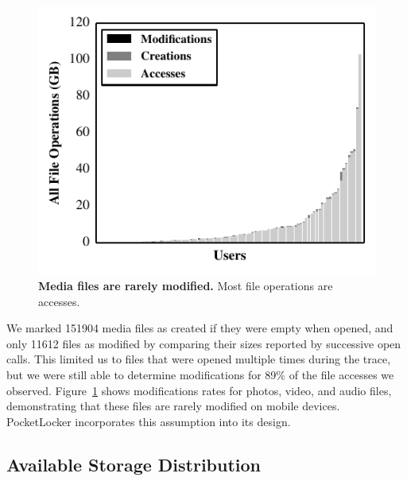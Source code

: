 \begin{figure}[t]

\includegraphics[width=\columnwidth]{./figures/pocketlocker/OperationPercentageGraph.pdf}

\caption{\small \textbf{Media files are rarely modified.} Most file
operations are accesses.}

\label{fig-motivation-modification}

\end{figure}

We marked \num{151904} media files as created if they were empty when opened,
and only \num{11612} files as modified by comparing their sizes reported by
successive open calls. This limited us to files that were opened multiple
times during the trace, but we were still able to determine modifications for
89\% of the file accesses we observed.
Figure~\ref{fig-motivation-modification} shows modifications rates for
photos, video, and audio files, demonstrating that these files are rarely
modified on mobile devices. PocketLocker incorporates this assumption into
its design.

\subsection{Available Storage Distribution}

